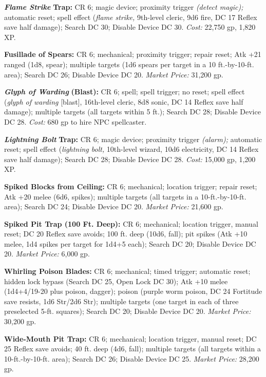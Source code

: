 \documentclass{article}
\begin{document}
\textit{\textbf{Flame Strike }}\textbf{Trap: }CR 6; magic device; proximity trigger 
\textit{(detect magic); }automatic reset; spell effect (\textit{flame strike, }9th-level 
cleric, 9d6 fire, DC 17 Reflex save half damage); Search DC 30; Disable Device 
DC 30. \textit{Cost: }22,750 gp, 1,820 XP.

\textbf{Fusillade of Spears: }CR 6; mechanical; proximity trigger; repair reset; 
Atk +21 ranged (1d8, spear); multiple targets (1d6 spears per target in a 10 ft.-by-10-ft. 
area); Search DC 26; Disable Device DC 20. \textit{Market Price: }31,200 gp.

\textit{\textbf{Glyph of Warding }}\textbf{(Blast): }CR 6; spell; spell trigger; 
no reset; spell effect (\textit{glyph of warding }[blast], 16th-level cleric, 8d8 
sonic, DC 14 Reflex save half damage); multiple targets (all targets within 5 ft.); 
Search DC 28; Disable Device DC 28. \textit{Cost: }680 gp to hire NPC spellcaster.

\textit{\textbf{Lightning Bolt }}\textbf{Trap: }CR 6; magic device; proximity trigger 
\textit{(alarm); }automatic reset; spell effect (\textit{lightning bolt, }10th-level 
wizard, 10d6 electricity, DC 14 Reflex save half damage); Search DC 28; Disable 
Device DC 28. \textit{Cost: }15,000 gp, 1,200 XP.

\textbf{Spiked Blocks from Ceiling: }CR 6; mechanical; location trigger; repair 
reset; Atk +20 melee (6d6, spikes); multiple targets (all targets in a 10-ft.-by-10-ft. 
area); Search DC 24; Disable Device DC 20. \textit{Market Price: }21,600 gp.

\textbf{Spiked Pit Trap (100 Ft. Deep):} CR 6; mechanical; location trigger, manual 
reset; DC 20 Reflex save avoids; 100 ft. deep (10d6, fall); pit spikes (Atk +10 
melee, 1d4 spikes per target for 1d4+5 each); Search DC 20; Disable Device DC 20. 
\textit{Market Price: }6,000 gp.

\textbf{Whirling Poison Blades: }CR 6; mechanical; timed trigger; automatic reset; 
hidden lock bypass (Search DC 25, Open Lock DC 30); Atk +10 melee (1d4+4/19-20 
plus poison, dagger); poison (purple worm poison, DC 24 Fortitude save resists, 
1d6 Str/2d6 Str); multiple targets (one target in each of three preselected 5-ft. 
squares); Search DC 20; Disable Device DC 20. \textit{Market Price: }30,200 gp.

\textbf{Wide-Mouth Pit Trap: }CR 6; mechanical; location trigger, manual reset; 
DC 25 Reflex save avoids; 40 ft. deep (4d6, fall); multiple targets (all targets 
within a 10-ft.-by-10-ft. area); Search DC 26; Disable Device DC 25. \textit{Market 
Price: }28,200 gp.
\end{document}
